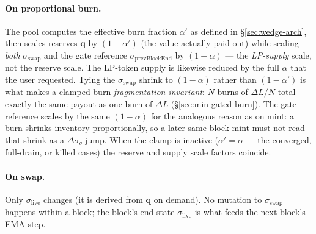\documentclass[11pt]{article}
\begin{document}
\paragraph{On proportional burn.}
The pool computes the effective burn fraction $\alpha'$ as defined in
\S\ref{sec:wedge-arch}, then scales reserves $\mathbf{q}$ by
$(1 - \alpha')$ (the value actually paid out) while scaling \emph{both}
$\sigma_{\mathrm{swap}}$ and the gate reference
$\sigma_{\mathrm{prevBlockEnd}}$ by $(1 - \alpha)$ --- the
\emph{LP-supply} scale, not the reserve scale. The LP-token supply is
likewise reduced by the full $\alpha$ that the user requested. Tying the
$\sigma_{\mathrm{swap}}$ shrink to $(1 - \alpha)$ rather than
$(1 - \alpha')$ is what makes a clamped burn
\emph{fragmentation-invariant}: $N$ burns of $\Delta L/N$ total exactly
the same payout as one burn of $\Delta L$
(\S\ref{sec:min-gated-burn}). The gate reference scales by the same
$(1 - \alpha)$ for the analogous reason as on mint: a burn shrinks
inventory proportionally, so a later same-block mint must not read that
shrink as a $\Delta\sigma_q$ jump. When the clamp is inactive ($\alpha'
= \alpha$ --- the converged, full-drain, or killed cases) the reserve
and supply scale factors coincide.

\paragraph{On swap.}
Only $\sigma_{\mathrm{live}}$ changes (it is derived from
$\mathbf{q}$ on demand). No mutation to $\sigma_{\mathrm{swap}}$
happens within a block; the block's end-state $\sigma_{\mathrm{live}}$
is what feeds the next block's EMA step.
\end{document}
